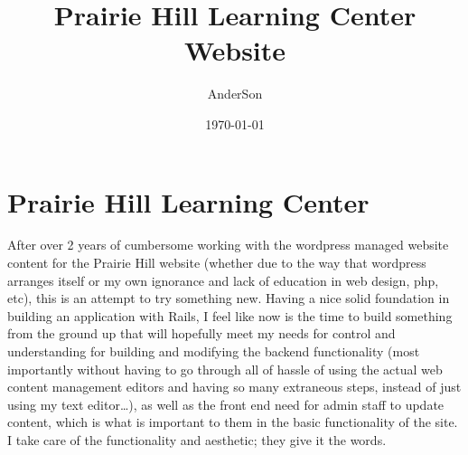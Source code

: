 \documentclass[11pt]{article}
\author{AnderSon}
\date{\today}
\title{Prairie Hill Learning Center Website}
\begin{document}
\maketitle

\section*{Prairie Hill Learning Center}
\label{sec-1}
After over 2 years of cumbersome working with the wordpress managed website 
content for the Prairie Hill website (whether due to the way that wordpress 
arranges itself or my own ignorance and lack of education in web design, php, 
etc), this is an attempt to try something new. Having a nice solid foundation 
in building an application with Rails, I feel like now is the time to build 
something from the ground up that will hopefully meet my needs for control 
and understanding for building and modifying the backend functionality 
(most importantly without having to go through all of hassle of using the 
actual web content management editors and having so many extraneous steps,
instead of just using my text editor\ldots{}), as well as the front end need
for admin staff to update content, which is what is important to them in
the basic functionality of the site. I take care of the functionality and
aesthetic; they give it the words.
\end{document}
